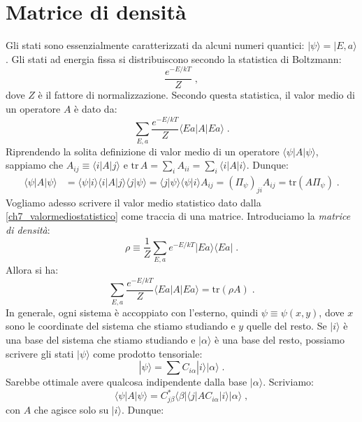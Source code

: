 \documentclass[10pt,a4paper]{report}
\theoremstyle{definition}
\numberwithin{equation}{section}
\newcommand{\bra}{\langle}
\newcommand{\ket}{\rangle}
\newcommand{\tr}{\mathrm{tr}}
\begin{document}
\section{Matrice di densità}
Gli stati sono essenzialmente caratterizzati da alcuni numeri quantici: $|\psi\ket=|E,a\ket$. Gli stati ad energia fissa si distribuiscono secondo la statistica di Boltzmann:
\begin{equation}
\frac{e^{-E/kT}}{Z}\;,
\end{equation}
dove $Z$ è il fattore di normalizzazione. Secondo questa statistica, il valor medio di un operatore $A$ è dato da:
\begin{equation}
\sum_{E,a} \frac{e^{-E/kT}}{Z}\bra Ea|A|Ea\ket\;. \label{ch7_valormediostatistico}
\end{equation}
Riprendendo la solita definizione di valor medio di un operatore $\bra \psi|A|\psi\ket$, sappiamo che $A_{ij}\equiv \bra i|A|j\ket$ e $\tr\, A=\sum_i A_{ii}=\sum_i \bra i|A|i\ket$. Dunque:
\begin{align}
\bra \psi|A|\psi\ket &= \bra\psi|i\ket\bra i|A|j\ket\bra j|\psi\ket = \bra j|\psi\ket\bra \psi|i\ket A_{ij} = \left(\Pi_{\psi}\right)_{ji}A_{ij} = \tr (A\Pi_{\psi})\;.
\end{align}
Vogliamo adesso scrivere il valor medio statistico dato dalla \eqref{ch7_valormediostatistico} come traccia di una matrice. Introduciamo la \textit{matrice di densità}:
\begin{equation}
\rho\equiv \frac{1}{Z}\sum_{E,a}e^{-E/kT}|Ea\ket\bra Ea|\;.
\end{equation}
Allora si ha:
\begin{equation}
\sum_{E,a} \frac{e^{-E/kT}}{Z}\bra Ea|A|Ea\ket=\tr (\rho A)\;.
\end{equation}
In generale, ogni sistema è accoppiato con l'esterno, quindi $\psi\equiv \psi(x,y)$, dove $x$ sono le coordinate del sistema che stiamo studiando e $y$ quelle del resto. Se $|i\ket$ è una base del sistema che stiamo studiando e $|\alpha\ket$ è una base del resto, possiamo scrivere gli stati $|\psi\ket$ come prodotto tensoriale:
\begin{equation}
|\psi\ket=\sum C_{i\alpha}|i\ket|\alpha\ket\;.
\end{equation}
Sarebbe ottimale avere qualcosa indipendente dalla base $|\alpha\ket$. Scriviamo:
\begin{equation}
\bra \psi|A|\psi\ket=C_{j\beta}^*\bra\beta|\bra j|AC_{i\alpha}|i\ket|\alpha\ket\;,
\end{equation}
con $A$ che agisce solo su $|i\ket$. Dunque:
\end{document}
